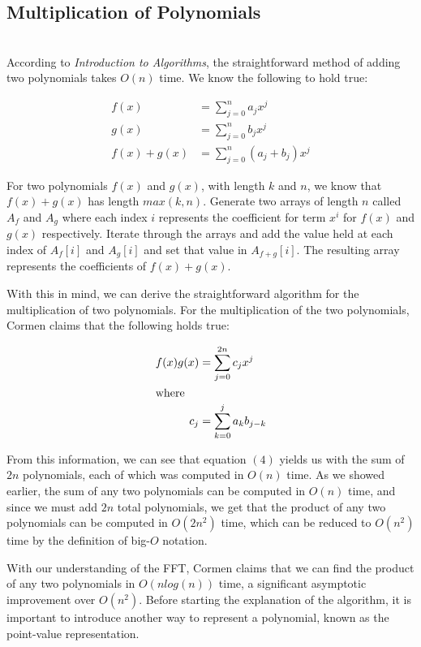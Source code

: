 \documentclass{amsproc}
\begin{document}
\subsection{Multiplication of Polynomials}

\mbox{}	 \\
\indent According to \textit{Introduction to Algorithms}, the straightforward method of adding two polynomials takes $O(n)$ time. We know the following to hold true:

\begin{align}
f(x) &= \sum_{j = 0}^{n} a_j x^j \\
g(x) &= \sum_{j = 0}^{n} b_j x^j \\ 
f(x) + g(x) &= \sum_{j = 0}^{n} (a_j + b_j)  x^j 
\end{align}

For two polynomials $f(x)$ and $g(x)$, with length $k$ and $n$, we know that $f(x) + g(x)$ has length $max(k, n)$. Generate two arrays of length $n$ called $A_f$ and $A_g$ where each index $i$ represents the coefficient for term $x^i$ for $f(x)$ and $g(x)$ respectively. Iterate through the arrays and add the value held at each index of $A_f[i]$ and $A_g[i]$ and set that value in $A_{f+g}[i]$. The resulting array represents the coefficients of $f(x)+g(x)$.

With this in mind, we can derive the straightforward algorithm for the multiplication of two polynomials. For the multiplication of the two polynomials, Cormen claims that the following holds true:

\begin{align}
f(x)g(x) &= \sum_{j = 0}^{2n} c_j  x^j \\
\intertext{where}
c_j &=  \sum_{k = 0}^{j} a_k b_{j-k}
\end{align}

From this information, we can see that equation $(4)$ yields us with the sum of $2n$ polynomials, each of which was computed in $O(n)$ time. As we showed earlier, the sum of any two polynomials can be computed in $O(n)$ time, and since we must add $2n$ total polynomials, we get that the product of any two polynomials can be computed in $O(2n^2)$ time, which can be reduced to $O(n^2)$ time by the definition of big-$O$ notation.

With our understanding of the FFT, Cormen claims that we can find the product of any two polynomials in $O(nlog(n))$ time, a significant asymptotic improvement over $O(n^2)$.  Before starting the explanation of the algorithm, it is important to introduce another way to represent a polynomial, known as the point-value representation. 
\end{document}

